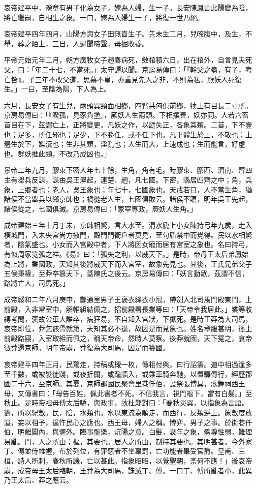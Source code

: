 \begin{pinyinscope}
哀帝建平中，豫章有男子化為女子，嫁為人婦，生一子。長安陳鳳言此陽變為陰，將亡繼嗣，自相生之象。一曰，嫁為人婦生一子，將復一世乃絕。

哀帝建平四年四月，山陽方與女子田無嗇生子。先未生二月，兒啼腹中，及生，不舉，葬之陌上，三日，人過聞啼聲，母掘收養。

平帝元始元年二月，朔方廣牧女子趙春病死，斂棺積六日，出在棺外，自言見夫死父，曰：「年二十七，不當死。」太守譚以聞。京房易傳曰：「『幹父之蠱，有子，考亡咎』。子三年不改父道，思慕不皇，亦重見先人之非，不則為私，厥妖人死復生。」一曰，至陰為陽，下人為上。

六月，長安女子有生兒，兩頭異頸面相鄉，四臂共匈俱前鄉，犊上有目長二寸所。京房易傳曰：「『睽孤，見豕負塗』，厥妖人生兩頭。下相攘善，妖亦同。人若六畜首目在下，茲謂亡上，正將變更。凡妖之作，以譴失正，各象其類。二首，下不壹也；足多，所任邪也；足少，下不勝任，或不任下也。凡下體生於上，不敬也；上體生於下，媟瀆也；生非其類，淫亂也；人生而大，上速成也；生而能言，好虛也。群妖推此類，不改乃成凶也。」

景帝二年九月，膠東下密人年七十餘，生角，角有毛。時膠東、膠西、濟南、齊四主有舉兵反謀，謀由吳王濞起，連楚、趙，凡七國。下密，縣居四齊之中；角，兵象，上鄉者也；老人，吳王象也；年七十，七國象也。天戒若曰，人不當生角，猶諸侯不當舉兵以鄉京師也；禍從老人生，七國俱敗云。諸侯不寤，明年吳王先起，諸侯從之，七國俱滅。京房易傳曰：「冢宰專政，厥妖人生角。」

成帝建始三年十月丁未，京師相驚，言大水至。渭水虒上小女陳持弓年九歲，走入橫城門，入未央宮尚方掖門，殿門門衛戶者莫見，至句盾禁中而覺得。民以水相驚者，陰氣盛也。小女而入宮殿中者，下人將因女寵而居有宮室之象也。名曰持弓，有似周家览弧之祥。《易》曰：「弧矢之利，以威天下。」是時，帝母王太后弟鳳始為上將，秉國政，天知其後將威天下而入宮室，故象先見也。其後，王氏兄弟父子五侯秉權，至莽卒篡天下，蓋陳氏之後云。京房易傳曰：「妖言動眾，茲謂不信，路將亡人，司馬死。」

成帝綏和二年八月庚申，鄭通里男子王褒衣絳衣小冠，帶劍入北司馬門殿東門，上前殿，入非常室中，解帷組結佩之，招前殿署長業等曰：「天帝令我居此。」業等收縛考問，褒故公車大誰卒，病狂易，不自知入宮狀，下獄死。是時王莽為大司馬，哀帝即位，莽乞骸骨就第，天知其必不退，故因是而見象也。姓名章服甚明，徑上前殿路寢，入室取組而佩之，稱天帝命，然時人莫察。後莽就國，天下冤之，哀帝徵莽還京師。明年帝崩，莽復為大司馬，因是而篡國。

哀帝建平四年正月，民驚走，持稿或棷一枚，傳相付與，曰行詔籌。道中相過逢多至千數，或被髮徒踐，或夜折關，或踰牆入，或乘車騎奔馳，以置驛傳行，經歷郡國二十六，至京師。其夏，京師郡國民聚會里巷仟佰，設祭張博具，歌舞祠西王母，又傳書曰：「母告百姓，佩此書者不死。不信我言，視門樞下，當有白髮。」至秋止。是時帝祖母傅太后驕，與政事，故杜鄴對曰：「春秋災異，以指象為言語。籌，所以紀數。民，陰，水類也。水以東流為順走，而西行，反類逆上。象數度放溢，妄以相予，違忤民心之應也。西王母，婦人之稱。博弈，男子之事。於街巷仟伯，明離闑內，與疆外。臨事盤樂，炕陽之意。白髮，衰年之象，體尊性弱，難理易亂。門，人之所由；樞，其要也。居人之所由，制持其要也。其明甚者。今外家丁、傅並侍帷幄，布於列位，有罪惡者不坐辜罰，亡功能者畢受官爵。皇甫、三桓，詩人所刺，春秋所譏，亡以甚此。指象昭昭，以覺聖朝，柰何不應！」後哀帝崩，成帝母王太后臨朝，王莽為大司馬，誅滅丁、傅。一曰丁、傅所亂者小，此異乃王太后、莽之應云。


\end{pinyinscope}
